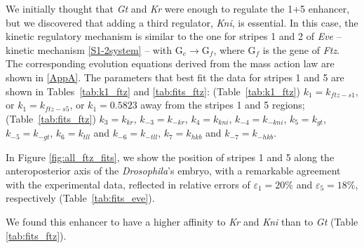 \documentclass[final,authoryear, 5p, times]{elsarticle}
\begin{document}
We initially thought that \textit{Gt} and \textit{Kr} were enough to regulate the 1+5 enhancer, but we discovered that adding a third regulator, \textit{Kni}, is essential. In this case, the kinetic regulatory mechanism is similar to the one for stripes 1 and 2 of \textit{Eve} -- kinetic mechanism \eqref{S1-2system} --  with $\text{G}_e\to \text{G}_f$,
where $\text{G}_f$ is the gene of \textit{Ftz}. The corresponding evolution equations derived from the mass action law are shown in \ref{AppA}. The parameters that best fit the data for stripes 1 and 5 are shown in Tables~\ref{tab:k1_ftz} and \ref{tab:fits_ftz}:
 (Table~\ref{tab:k1_ftz}) $k_1=k_{ftz-s1}$, or $k_1=k_{ftz-s5}$, or {$k_1=0.5823$ away from the stripes 1 and 5 regions}; (Table~\ref{tab:fits_ftz}) $k_3=k_{kr}$, $k_{-3}=k_{-kr}$, $k_4=k_{kni}$, $k_{-4}=k_{-kni}$, $k_5=k_{gt}$, $k_{-5}=k_{-gt}$, $k_6=k_{tll}$ and $k_{-6}=k_{-tll}$, $k_7=k_{hkb}$ and $k_{-7}=k_{-hkb}$.

In Figure \ref{fig:all_ftz_fits}, we show the position of stripes 1 and 5 along the anteroposterior axis of the \textit{Drosophila}'s embryo, with a remarkable agreement with the experimental data, reflected in relative errors of $\varepsilon_1=20\%$ and $\varepsilon_5=18\%$, respectively (Table~\ref{tab:fits_eve}).


We found this enhancer to have a higher affinity to \textit{Kr} and \textit{Kni} than to \textit{Gt} (Table \ref{tab:fits_ftz}).


\begin{table}[h!] 
	\centering
	\caption{\small{\textit{Ftz} production rate values that best fit the experimental data at time class 8 of mitotic cycle 14 of \textit{Drosophila} embryogenesis shown in Figure \ref{fig:all_ftz_fits}.}}
	\label{tab:k1_ftz}
\end{table}
\end{document}
